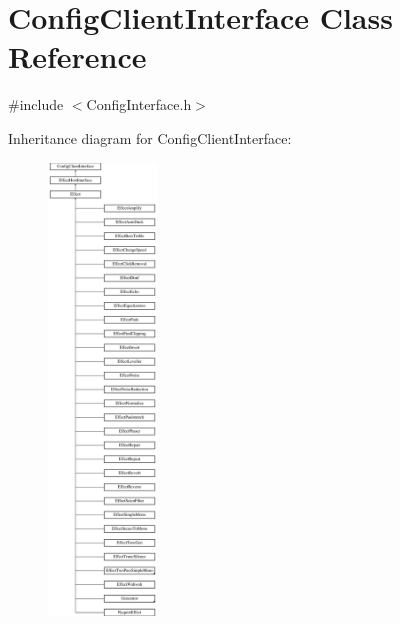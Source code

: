 \hypertarget{class_config_client_interface}{}\section{Config\+Client\+Interface Class Reference}
\label{class_config_client_interface}


{\ttfamily \#include $<$Config\+Interface.\+h$>$}

Inheritance diagram for Config\+Client\+Interface\+:\begin{figure}[H]
\begin{center}
\leavevmode
\includegraphics[height=12.000000cm]{class_config_client_interface}
\end{center}
\end{figure}
